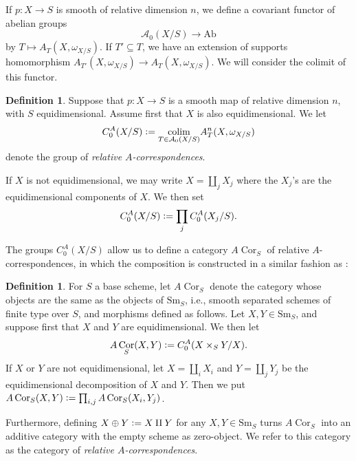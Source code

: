 \documentclass[a4paper, oneside, english,reqno]{amsart}
\theoremstyle{plain}
\theoremstyle{definition}
\newtheorem{definition}[theorem]{Definition}
\theoremstyle{remark}
\newcommand{\defeq}{\vcentcolon=}
\newcommand{\calA}{\mathcal{A}}
\newcommand{\Ab}{\mathrm{Ab}}
\newcommand{\Sm}{\mathrm{Sm}}
\DeclareMathOperator{\Cor}{Cor}
\DeclareMathOperator{\colim}{colim}
\begin{document}

If $p\colon X\to S$ is smooth of relative dimension $n$, we define a covariant functor of abelian groups
\[
\calA_0(X/S)\to\Ab
\]
by $T\mapsto A_T(X,\omega_{X/S})$. If $T'\subseteq T$, we have an extension of supports homomorphism $A_{T'}(X,\omega_{X/S})\to A_{T}(X,\omega_{X/S})$. We will consider the colimit of this functor.

\begin{definition}\label{def:rel}
Suppose that $p\colon X\to S$ is a smooth map of relative dimension $n$, with $S$ equidimensional. Assume first that $X$ is also equidimensional. We let
\[
C^A_0(X/S)\defeq \underset{T\in\calA_0(X/S)}{\colim} A_T^{n}(X,\omega_{X/S})
\]
denote the group of \emph{relative $A$-correspondences}.

If $X$ is not equidimensional, we may write $X=\coprod_j X_j$ where the $X_j$'s are the equidimensional components of $X$. We then set
\[
C^A_0(X/S)\defeq\prod_j C^A_0(X_j/S).
\]
\end{definition}

The groups $C_0^A(X/S)$ allow us to define a category $A\Cor_S$ of relative $A$-correspondences, in which the composition is constructed in a similar fashion as \cite{Calmes-Fasel}:

\begin{definition}
For $S$ a base scheme, let $A\Cor_S$ denote the category whose objects are the same as the objects of $\Sm_S$, i.e., smooth separated schemes of finite type over $S$, and morphisms defined as follows. Let $X,Y\in\Sm_S$, and suppose first that $X$ and $Y$ are equidimensional. We then let
\[
A\Cor_S(X,Y)\defeq C^A_0(X\times_S Y/X).\]
If $X$ or $Y$ are not equidimensional, let $X=\coprod_iX_i$ and $Y=\coprod_jY_j$ be the equidimensional decomposition of $X$ and $Y$. Then we put $A\Cor_S(X,Y)\defeq\prod_{i,j}A\Cor_S(X_i,Y_j)$.

Furthermore, defining $X\oplus Y\defeq X\amalg Y$ for any $X,Y\in\Sm_S$ turns $A\Cor_S$ into an additive category with the empty scheme as zero-object. We refer to this category as the category of \emph{relative $A$-correspondences}.
\end{definition}
\end{document}
